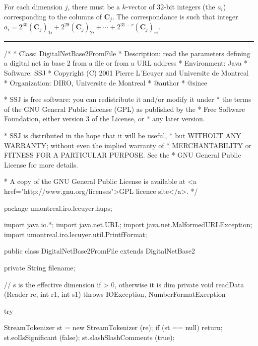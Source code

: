  For each dimension $j$, there must be a $k$-vector of 32-bit integers
 (the $a_i$) corresponding to the columns of $\mathbf{C}_j$. The
  correspondance is such that integer
  $a_i = 2^{30}(\mathbf{C}_j)_{1i} + 2^{29}(\mathbf{C}_j)_{2i} +
   \cdots +    2^{31 - r}(\mathbf{C}_j)_{ri}$.


\bigskip\hrule\bigskip

\begin{code}
\begin{hide}
/*
 * Class:        DigitalNetBase2FromFile
 * Description:  read the parameters defining a digital net in base 2
                 from a file or from a URL address
 * Environment:  Java
 * Software:     SSJ
 * Copyright (C) 2001  Pierre L'Ecuyer and Universite de Montreal
 * Organization: DIRO, Universite de Montreal
 * @author
 * @since

 * SSJ is free software: you can redistribute it and/or modify it under
 * the terms of the GNU General Public License (GPL) as published by the
 * Free Software Foundation, either version 3 of the License, or
 * any later version.

 * SSJ is distributed in the hope that it will be useful,
 * but WITHOUT ANY WARRANTY; without even the implied warranty of
 * MERCHANTABILITY or FITNESS FOR A PARTICULAR PURPOSE.  See the
 * GNU General Public License for more details.

 * A copy of the GNU General Public License is available at
   <a href="http://www.gnu.org/licenses">GPL licence site</a>.
 */
\end{hide}
package umontreal.iro.lecuyer.hups;\begin{hide}

import java.io.*;
import java.net.URL;
import java.net.MalformedURLException;
import umontreal.iro.lecuyer.util.PrintfFormat;
\end{hide}

public class DigitalNetBase2FromFile extends DigitalNetBase2 \begin{hide} {
   private String filename;

   // s is the effective dimension if > 0, otherwise it is dim
   private void readData (Reader re, int r1, int s1)
       throws IOException, NumberFormatException
   {
      try {
         StreamTokenizer st = new StreamTokenizer (re);
         if (st == null) return;
         st.eolIsSignificant (false);
         st.slashSlashComments (true);

}}}
\end{hide}
\end{code}
